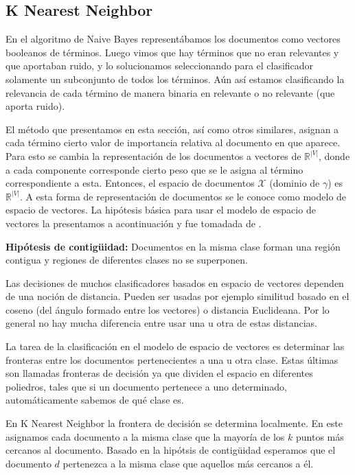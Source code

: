 \documentclass{llncs}
\begin{document}
	\subsection{K Nearest Neighbor}
	
		En el algoritmo de Naive Bayes represent\'abamos los documentos como vectores booleanos de t\'erminos. Luego vimos que hay t\'erminos que no eran relevantes y que aportaban ruido, y lo solucionamos seleccionando para el clasificador solamente un subconjunto de todos los t\'erminos. A\'un as\'i estamos clasificando la relevancia de cada t\'ermino de manera binaria en relevante o no relevante (que aporta ruido).
		
		 El m\'etodo que presentamos en esta secci\'on, as\'i como otros similares, asignan a cada t\'ermino cierto valor de importancia relativa al documento en que aparece. Para esto se cambia la representaci\'on de los documentos a vectores de $\mathbb{R}^{|V|}$, donde a cada componente corresponde cierto peso que se le asigna al t\'ermino correspondiente a esta. Entonces, el espacio de documentos $\mathcal{X}$ (dominio de $\gamma$) es $\mathbb{R}^{|V|}$. A esta forma de representaci\'on de documentos se le conoce como modelo de espacio de vectores. La hip\'otesis b\'asica para usar el modelo de espacio de vectores la presentamos a acontinuaci\'on y fue tomadada de \cite[p. 289]{B1}.
		 
		 \textbf{Hip\'otesis de contig\"uidad:} Documentos en la misma clase forman una regi\'on contigua  y regiones de diferentes clases no se superponen.
		 
		 Las decisiones de muchos clasificadores basados en espacio de vectores dependen de una noci\'on de distancia. Pueden ser usadas por ejemplo similitud basado en el coseno (del \'angulo formado entre los vectores) o distancia Euclideana. Por lo general no hay mucha diferencia entre usar una u otra de estas distancias.
		 
		 La tarea de la clasificaci\'on en el modelo de espacio de vectores es determinar las fronteras entre los documentos pertenecientes a una u otra clase. Estas \'ultimas son llamadas fronteras de decisi\'on ya que dividen el espacio en diferentes poliedros, tales que si un documento pertenece a uno determinado, autom\'aticamente sabemos de qu\'e clase es. 
		 
		 En K Nearest Neighbor la frontera de decisi\'on se determina localmente. En este asignamos cada documento a la misma clase que la mayor\'ia de los $k$ puntos m\'as cercanos al documento. Basado en la hip\'otsis de contig\"uidad esperamos que el documento $d$ pertenezca a la misma clase que aquellos m\'as cercanos a \'el.
		 
\end{document}
